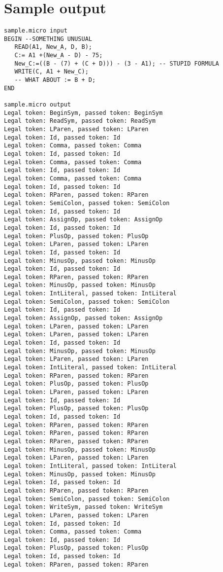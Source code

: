 \documentclass[a4paper]{article}
\begin{document}
\section{Sample output}
\label{sec-3}
\begin{verbatim}
sample.micro input
BEGIN --SOMETHING UNUSUAL
   READ(A1, New_A, D, B);
   C:= A1 +(New_A - D) - 75;
   New_C:=((B - (7) + (C + D))) - (3 - A1); -- STUPID FORMULA
   WRITE(C, A1 + New_C);
   -- WHAT ABOUT := B + D;
END

sample.micro output
Legal token: BeginSym, passed token: BeginSym
Legal token: ReadSym, passed token: ReadSym
Legal token: LParen, passed token: LParen
Legal token: Id, passed token: Id
Legal token: Comma, passed token: Comma
Legal token: Id, passed token: Id
Legal token: Comma, passed token: Comma
Legal token: Id, passed token: Id
Legal token: Comma, passed token: Comma
Legal token: Id, passed token: Id
Legal token: RParen, passed token: RParen
Legal token: SemiColon, passed token: SemiColon
Legal token: Id, passed token: Id
Legal token: AssignOp, passed token: AssignOp
Legal token: Id, passed token: Id
Legal token: PlusOp, passed token: PlusOp
Legal token: LParen, passed token: LParen
Legal token: Id, passed token: Id
Legal token: MinusOp, passed token: MinusOp
Legal token: Id, passed token: Id
Legal token: RParen, passed token: RParen
Legal token: MinusOp, passed token: MinusOp
Legal token: IntLiteral, passed token: IntLiteral
Legal token: SemiColon, passed token: SemiColon
Legal token: Id, passed token: Id
Legal token: AssignOp, passed token: AssignOp
Legal token: LParen, passed token: LParen
Legal token: LParen, passed token: LParen
Legal token: Id, passed token: Id
Legal token: MinusOp, passed token: MinusOp
Legal token: LParen, passed token: LParen
Legal token: IntLiteral, passed token: IntLiteral
Legal token: RParen, passed token: RParen
Legal token: PlusOp, passed token: PlusOp
Legal token: LParen, passed token: LParen
Legal token: Id, passed token: Id
Legal token: PlusOp, passed token: PlusOp
Legal token: Id, passed token: Id
Legal token: RParen, passed token: RParen
Legal token: RParen, passed token: RParen
Legal token: RParen, passed token: RParen
Legal token: MinusOp, passed token: MinusOp
Legal token: LParen, passed token: LParen
Legal token: IntLiteral, passed token: IntLiteral
Legal token: MinusOp, passed token: MinusOp
Legal token: Id, passed token: Id
Legal token: RParen, passed token: RParen
Legal token: SemiColon, passed token: SemiColon
Legal token: WriteSym, passed token: WriteSym
Legal token: LParen, passed token: LParen
Legal token: Id, passed token: Id
Legal token: Comma, passed token: Comma
Legal token: Id, passed token: Id
Legal token: PlusOp, passed token: PlusOp
Legal token: Id, passed token: Id
Legal token: RParen, passed token: RParen


\end{verbatim}
\end{document}
